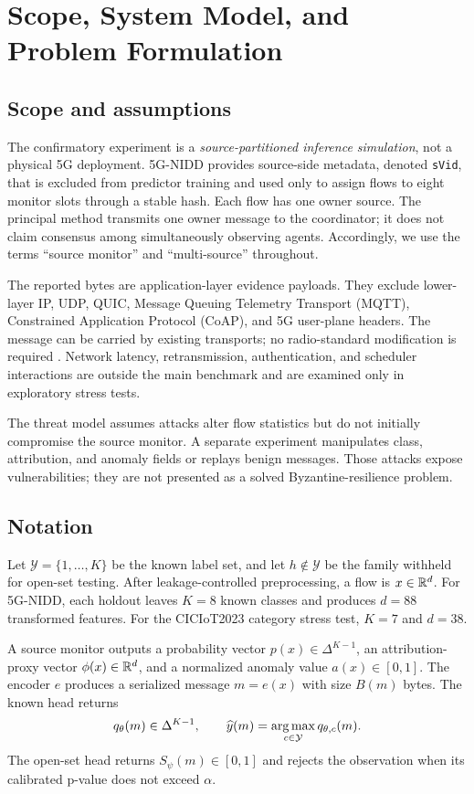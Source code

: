 \section{Scope, System Model, and Problem Formulation}

\subsection{Scope and assumptions}

The confirmatory experiment is a \emph{source-partitioned inference simulation}, not a physical 5G deployment. 5G-NIDD provides source-side metadata, denoted \texttt{sVid}, that is excluded from predictor training and used only to assign flows to eight monitor slots through a stable hash. Each flow has one owner source. The principal method transmits one owner message to the coordinator; it does not claim consensus among simultaneously observing agents. Accordingly, we use the terms ``source monitor'' and ``multi-source'' throughout.

The reported bytes are application-layer evidence payloads. They exclude lower-layer IP, UDP, QUIC, Message Queuing Telemetry Transport (MQTT), Constrained Application Protocol (CoAP), and 5G user-plane headers. The message can be carried by existing transports; no radio-standard modification is required \cite{rfc7252,mqtt5}. Network latency, retransmission, authentication, and scheduler interactions are outside the main benchmark and are examined only in exploratory stress tests.

The threat model assumes attacks alter flow statistics but do not initially compromise the source monitor. A separate experiment manipulates class, attribution, and anomaly fields or replays benign messages. Those attacks expose vulnerabilities; they are not presented as a solved Byzantine-resilience problem.

\subsection{Notation}

Let $\mathcal{Y}=\{1,\ldots,K\}$ be the known label set, and let $h\notin\mathcal{Y}$ be the family withheld for open-set testing. After leakage-controlled preprocessing, a flow is $x\in\mathbb{R}^d$. For 5G-NIDD, each holdout leaves $K=8$ known classes and produces $d=88$ transformed features. For the CICIoT2023 category stress test, $K=7$ and $d=38$.

A source monitor outputs a probability vector $p(x)\in\Delta^{K-1}$, an attribution-proxy vector $\phi(x)\in\mathbb{R}^d$, and a normalized anomaly value $a(x)\in[0,1]$. The encoder $e$ produces a serialized message $m=e(x)$ with size $B(m)$ bytes. The known head returns
\begin{equation}
q_\theta(m)\in\Delta^{K-1},\qquad
\widehat{y}(m)=\operatorname*{arg\,max}_{c\in\mathcal{Y}}q_{\theta,c}(m).
\label{eq:knownhead}
\end{equation}
The open-set head returns $S_\psi(m)\in[0,1]$ and rejects the observation when its calibrated p-value does not exceed $\alpha$.


